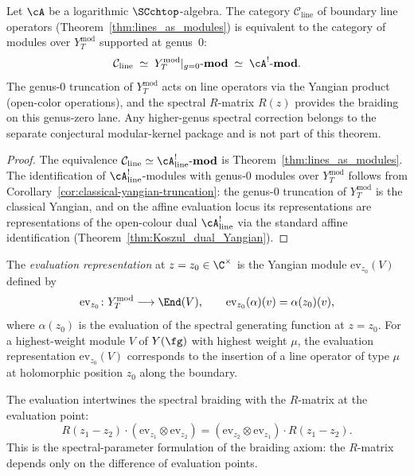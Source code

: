 \begin{theorem}
Let\/ $\cA$ be a logarithmic\/ $\SCchtop$-algebra. The category $\mathcal{C}_{\mathrm{line}}$
of boundary line operators (Theorem~\ref{thm:lines_as_modules}) is
equivalent to the category of modules over $Y_T^{\mathrm{mod}}$
supported at genus~$0$:
\begin{equation}
\mathcal{C}_{\mathrm{line}}
\;\simeq\;
Y_T^{\mathrm{mod}}|_{g=0}\text{-}\mathbf{mod}
\;\simeq\;
\cA^!\text{-}\mathbf{mod}.
\end{equation}
The genus-$0$ truncation of $Y_T^{\mathrm{mod}}$ acts on line
operators via the Yangian product (open-color operations), and the
spectral $R$-matrix $R(z)$ provides the braiding on this genus-zero
lane. Any higher-genus spectral correction belongs to the separate
conjectural modular-kernel package and is not part of this theorem.
\end{theorem}

\begin{proof}
The equivalence
$\mathcal{C}_{\mathrm{line}} \simeq \cA^!_{\mathrm{line}}\text{-}\mathbf{mod}$
is Theorem~\ref{thm:lines_as_modules}. The identification of
$\cA^!_{\mathrm{line}}$-modules with genus-$0$ modules over
$Y_T^{\mathrm{mod}}$
follows from Corollary~\ref{cor:classical-yangian-truncation}: the
genus-$0$ truncation of $Y_T^{\mathrm{mod}}$ is the classical
Yangian, and on the affine evaluation locus its representations are
representations of the open-colour dual
$\cA^!_{\mathrm{line}}$ via the standard affine identification
(Theorem~\ref{thm:Koszul_dual_Yangian}).
\end{proof}

\begin{proposition}
The \emph{evaluation representation} at $z = z_0 \in \C^\times$ is
the Yangian module $\mathrm{ev}_{z_0}(V)$ defined by
\begin{equation}
\mathrm{ev}_{z_0} \colon Y_T^{\mathrm{mod}} \longrightarrow
\End(V), \qquad
\mathrm{ev}_{z_0}(\alpha)(v) = \alpha(z_0)(v),
\end{equation}
where $\alpha(z_0)$ is the evaluation of the spectral generating
function at $z = z_0$. For a highest-weight module $V$ of
$Y(\fg)$ with highest weight $\mu$, the evaluation representation
$\mathrm{ev}_{z_0}(V)$ corresponds to the insertion of a line
operator of type $\mu$ at holomorphic position $z_0$ along the
boundary.

The evaluation intertwines the spectral braiding with the
$R$-matrix at the evaluation point:
\[
R(z_1 - z_2) \cdot (\mathrm{ev}_{z_1} \otimes \mathrm{ev}_{z_2})
= (\mathrm{ev}_{z_2} \otimes \mathrm{ev}_{z_1}) \cdot R(z_1 - z_2).
\]
This is the spectral-parameter formulation of the braiding
axiom: the $R$-matrix depends only on the difference of
evaluation points.
\end{proposition}

